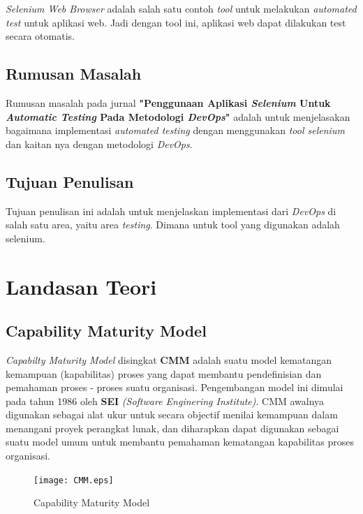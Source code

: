 \documentclass[9pt,twocolumn,twoside]{Gunadarma}
\begin{document}
\textit{Selenium Web Browser} adalah salah satu contoh \textit{tool} untuk melakukan \textit{automated test} untuk aplikasi web. Jadi dengan tool ini, aplikasi web dapat dilakukan test secara otomatis. 



\subsection{Rumusan Masalah}
Rumusan masalah pada jurnal \textbf{"Penggunaan Aplikasi \textit{Selenium} Untuk \textit{Automatic Testing} Pada Metodologi \textit{DevOps}"} adalah untuk menjelasakan bagaimana implementasi \textit{automated testing} dengan menggunakan \textit{tool selenium}  dan kaitan nya dengan metodologi \textit{DevOps}. 


\subsection{Tujuan Penulisan}
Tujuan penulisan ini adalah untuk menjelaskan implementasi dari \textit{DevOps }di salah satu area, yaitu area \textit{testing}. Dimana untuk tool yang digunakan adalah selenium. 


\section{Landasan Teori}

\subsection{Capability Maturity Model}
\textit{Capabilty Maturity Model} disingkat \textbf{CMM} adalah suatu model kematangan kemampuan (kapabilitas) proses yang dapat membantu pendefinisian dan pemahaman proses - proses suatu organisasi. Pengembangan model ini dimulai pada tahun 1986 oleh \textbf{SEI} \textit{(Software Enginering Institute)}. CMM awalnya digunakan sebagai alat ukur untuk secara objectif menilai kemampuan dalam menangani proyek perangkat lunak, dan diharapkan dapat digunakan sebagai suatu model umum untuk membantu pemahaman kematangan kapabilitas proses organisasi. 

\begin{figure}[htbp]
	\begin{center}
		\texttt{[image: CMM.eps]} \label{fig:1-noFCase1}
	\end{center}
	\caption{Capability Maturity Model}
\end{figure}
\end{document}
